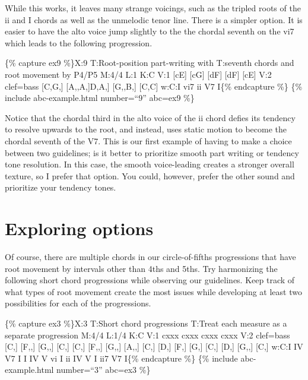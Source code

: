\documentclass{book}
\begin{document}
While this works, it leaves many strange voicings, such as the tripled roots
of the ii and I chords as well as the unmelodic tenor line. There is a simpler
option. It is easier to have the alto voice jump slightly to the the chordal
seventh on the vi7 which leads to the following progression.

\{\% capture ex9 \%\}X:9 T:Root-position part-writing with T:seventh chords
and root movement by P4/P5 M:4/4 L:1 K:C V:1 {[}cE{]}\textbar{}
{[}cG{]}\textbar{} {[}dF{]}\textbar{} {[}dF{]}\textbar{} {[}cE{]}\textbar{]}
V:2 clef=bass {[}C,G,{]}\textbar{} {[}A,,A,{]}\textbar{[}D,A,{]}\textbar{}
{[}G,,B,{]}\textbar{} {[}C,C{]}\textbar{]} w:C:I vi7 ii V7 I\{\% endcapture
\%\} \{\% include abc-example.html number=``9'' abc=ex9 \%\}

Notice that the chordal third in the alto voice of the ii chord defies its
tendency to resolve upwards to the root, and instead, uses static motion to
become the chordal seventh of the V7. This is our first example of having to
make a choice between two guidelines; is it better to prioritize smooth part
writing or tendency tone resolution. In this case, the smooth voice-leading
creates a stronger overall texture, so I prefer that option. You could,
however, prefer the other sound and prioritize your tendency tones.

\hypertarget{exploring-options}{%
\section{Exploring options}\label{exploring-options}}

Of course, there are multiple chords in our circle-of-fifths progressions that
have root movement by intervals other than 4ths and 5ths. Try harmonizing the
following short chord progressions while observing our guidelines. Keep track
of what types of root movement create the most issues while developing at
least two possibilities for each of the progressions.

\{\% capture ex3 \%\}X:3 T:Short chord progressions T:Treat each measure as a
separate progression M:4/4 L:1/4 K:C V:1 cxxx\textbar\textbar{}
cxxx\textbar\textbar{} cxxx\textbar\textbar{} cxxx\textbar{]} V:2 clef=bass
{[}C,{]} {[}F,,{]} {[}G,,{]} {[}C,{]}\textbar\textbar{} {[}C,{]} {[}F,,{]}
{[}G,,{]} {[}A,,{]}\textbar\textbar{} {[}C,{]} {[}D,{]} {[}F,{]}
{[}G,{]}\textbar\textbar{} {[}C,{]} {[}D,{]} {[}G,,{]} {[}C,{]}\textbar{]}
w:C:I IV V7 I I IV V vi I ii IV V I ii7 V7 I\{\% endcapture \%\} \{\% include
abc-example.html number=``3'' abc=ex3 \%\}
\end{document}
